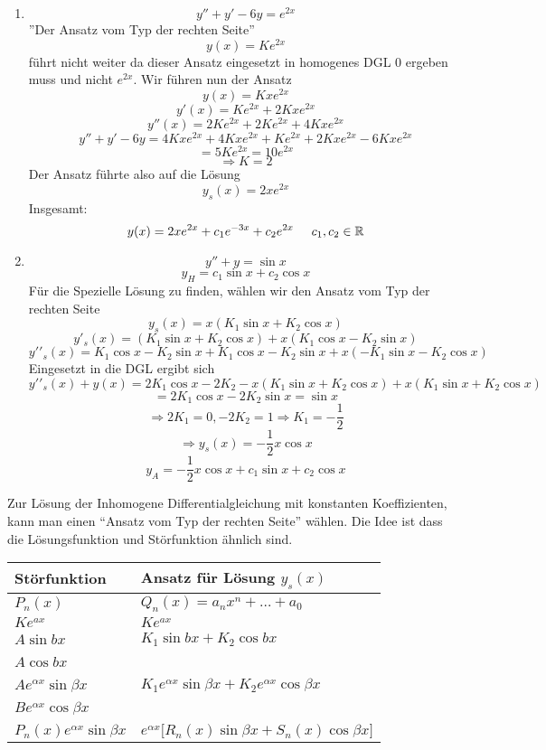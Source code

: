 \begin{enumerate}[\indent 3.]
\item \[y''+y'-6y=e^{2x}\]''Der Ansatz vom Typ der rechten Seite''\[y(x)=Ke^{2x}\] führt nicht weiter da dieser Ansatz eingesetzt in homogenes DGL 0 ergeben muss und nicht $e^{2x}$. Wir führen nun der Ansatz
\[y(x)=Kxe^{2x}\]
\[y'(x) = K{e^{2x}} + 2Kx{e^{2x}}\]
\[y''(x) = 2K{e^{2x}} + 2K{e^{2x}} + 4Kx{e^{2x}}\]
\[y'' + y' - 6y = 4Kx{e^{2x}} + 4Kx{e^{2x}} + K{e^{2x}} + 2Kx{e^{2x}} - 6Kx{e^{2x}}\]
\[ = 5K{e^{2x}} = 10{e^{2x}}\]
\[\Rightarrow K=2\]
Der Ansatz führte also auf die Lösung \[y_s(x)=2xe^{2x}\]
Insgesamt: \[y(x)=2xe^{2x}+c_1e^{-3x}+c_2e^{2x}\text{\hspace{5mm}}c_1,c_2\in\mathbb{R}\]
\item \[y''+y=\sin x\]
\[y_H=c_1\sin x+c_2\cos x\]
Für die Spezielle Lösung zu finden, wählen wir den Ansatz vom Typ der rechten Seite
\[{y_s}(x) = x\left( {{K_1}\sin x + {K_2}\cos x} \right)\]
\[y{'_s}(x) = \left( {{K_1}\sin x + {K_2}\cos x} \right) + x\left( {{K_1}\cos x - {K_2}\sin x} \right)\]
\[y'{'_s}(x) = {K_1}\cos x - {K_2}\sin x + {K_1}\cos x - {K_2}\sin x + x\left( { - {K_1}\sin x - {K_2}\cos x} \right)\]
Eingesetzt in die DGL ergibt sich
\[y'{'_s}(x) + y(x) = 2{K_1}\cos x - 2{K_2} - x({K_1}\sin x + {K_2}\cos x) + x({K_1}\sin x + {K_2}\cos x)\]
\[=2K_1\cos x-2K_2 \sin x=\sin x\]
\[\Rightarrow 2K_1=0, -2K_2=1\Rightarrow K_1=-\frac{1}{2}\]
\[\Rightarrow y_s(x)=-\frac{1}{2}x\cos x\]
\[y_A=-\frac{1}{2}x\cos x+c_1 \sin x+c_2\cos x\]
\end{enumerate}
Zur Lösung der Inhomogene Differentialgleichung mit konstanten Koeffizienten, kann man einen ``Ansatz vom Typ der rechten Seite'' wählen. Die Idee ist dass die Lösungsfunktion und Störfunktion ähnlich sind.

\renewcommand{\arraystretch}{1.6}
\begin{tabularx}{\textwidth}{|Y|Y|}
\hline
Störfunktion & Ansatz für Lösung $y_s(x)$  \\\hline\hline
$P_n(x)$        & $Q_n(x)=a_nx^n+\dots+a_0$  \\ [1.5ex]\hline
$Ke^{ax}$        & $Ke^{ax}$  \\ [1.5ex]\hline
$A\sin bx$        & $K_1\sin bx +K_2\cos bx $  \\ [1.5ex]
$A\cos bx$        & ~  \\ [1.5ex]\hline
$Ae^{\alpha x}\sin \beta x$        & $K_1e^{\alpha x}\sin\beta x+K_2 e^{\alpha x}\cos\beta x$  \\ [1.5ex]
$Be^{\alpha x}\cos \beta x$        & ~  \\ [1.5ex]\hline
$P_n(x)e^{\alpha x}\sin\beta x$        & $e^{\alpha x}\lbrack R_n(x)\sin\beta x+S_n(x)\cos\beta x\rbrack$  \\ [1.5ex]\hline
 \end{tabularx}\\

